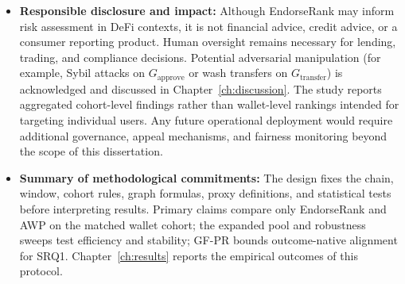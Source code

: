 \begin{itemize}
\item{}\label{sub:responsible-disclosure}
  \textbf{Responsible disclosure and impact:} Although EndorseRank may inform risk assessment in DeFi contexts, it is not financial advice, credit advice, or a consumer reporting product. Human oversight remains necessary for lending, trading, and compliance decisions. Potential adversarial manipulation (for example, Sybil attacks on $G_{\mathrm{approve}}$ or wash transfers on $G_{\mathrm{transfer}}$) is acknowledged and discussed in Chapter~\ref{ch:discussion}. The study reports aggregated cohort-level findings rather than wallet-level rankings intended for targeting individual users. Any future operational deployment would require additional governance, appeal mechanisms, and fairness monitoring beyond the scope of this dissertation.


\item{}\label{sub:methodological-commitments}
  \textbf{Summary of methodological commitments:} The design fixes the chain, window, cohort rules, graph formulas, proxy definitions, and statistical tests before interpreting results. Primary claims compare only EndorseRank and AWP on the matched wallet cohort; the expanded pool and robustness sweeps test efficiency and stability; GF-PR bounds outcome-native alignment for SRQ1. Chapter~\ref{ch:results} reports the empirical outcomes of this protocol.
\end{itemize}
